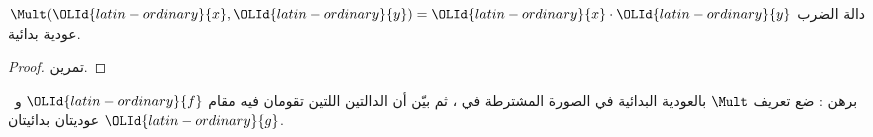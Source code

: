 \documentclass[../../../include/open-logic-section]{subfiles}
\begin{document}
\begin{prop}
  دالة الضرب $\Mult(\OLId{latin-ordinary}{x},\OLId{latin-ordinary}{y})=\OLId{latin-ordinary}{x}\cdot \OLId{latin-ordinary}{y}$ عودية بدائية.
\end{prop}

\begin{proof}
  تمرين.
\end{proof}

\begin{prob}
  برهن : ضع تعريف $\Mult$
  بالعودية البدائية في الصورة المشترطة في
  ، ثم بيّن أن الدالتين
  اللتين تقومان فيه مقام $\OLId{latin-ordinary}{f}$ و~$\OLId{latin-ordinary}{g}$ عوديتان بدائيتان.
\end{prob}
\end{document}
